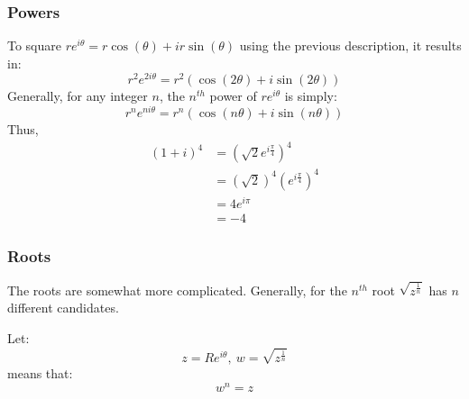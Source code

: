 \documentclass[12pt]{article}
\begin{document}
\subsubsection{Powers}
\label{sssec:powers}

To square $re^{i \theta} = r\cos(\theta) + ir\sin(\theta)$ using the previous description, it results in:
\begin{equation*}
  r^2e^{2i \theta} = r^2\left(\cos(2\theta) + i\sin(2\theta)\right)
\end{equation*}
Generally, for any integer $n$, the $n^{th}$ power of $re^{i\theta}$ is simply:
\begin{equation*}
  r^ne^{ni \theta} = r^n\left(\cos(n\theta) + i\sin(n\theta)\right)
\end{equation*}
Thus,
\begin{align*}
  (1+i)^4 &= \left(\sqrt{2}e^{i \frac{\pi}{4}}\right)^4 \\
          &= \left(\sqrt{2}\right)^4\left(e^{i \frac{\pi}{4}}\right)^4 \\
          &= 4e^{i\pi} \\
          &= -4
\end{align*}

\subsubsection{Roots}
\label{sssec:roots}

The roots are somewhat more complicated. Generally, for the $n^{th}$ root $\sqrt{z^{\frac{1}{n}}}$ has $n$ different candidates.

Let:
\begin{equation*}
  z=Re^{i \theta},\ w = \sqrt{z^{\frac{1}{n}}}
\end{equation*}
means that:
\begin{equation*}
 w^n = z
\end{equation*}
\end{document}
